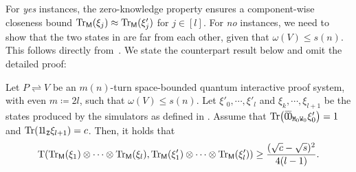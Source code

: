 \documentclass[10pt,a4paper]{article}
\numberwithin{equation}{section}
\numberwithin{figure}{section}
\newcommand{\protocol}[2]{{#1}\!\rightleftharpoons\!{#2}}
\DeclarePairedDelimiter\rbra{\lparen}{\rparen}
\let\ket\relax\DeclarePairedDelimiter\ket{\lvert}{\rangle}
\let\bra\relax\DeclarePairedDelimiter\bra{\langle}{\rvert}
\newcommand{\ketbra}[2]{\ensuremath{\ket{#1}\!\bra{#2}}}
\newcommand{\Tr}{\mathrm{Tr}}
\newcommand{\td}{\mathrm{T}}
\newcommand{\sfM}{\mathsf{M}}
\newcommand{\ttM}{\mathtt{M}}
\newcommand{\ttW}{\mathtt{W}}
\newcommand{\ttZ}{\mathtt{Z}}
\begin{document}
For \textit{yes} instances, the zero-knowledge property ensures a component-wise closeness bound $\Tr_{\sfM}\rbra*{\xi_j} \approx \Tr_{\sfM}(\xi'_j)$ for $j\in[l]$. 
For \textit{no} instances, we need to show that the two states in  are far from each other, given that $\omega(V) \leq s(n)$. This follows directly from~\cite[Lemma 15]{Wat02QSZK}. We state the counterpart result below and omit the detailed proof: 
\begin{proposition}
    \label{prop:QSZKLhard-soundness}
    Let $\protocol{P}{V}$ be an $m(n)$-turn space-bounded quantum interactive proof system, with even $m\coloneq 2l$, such that $\omega(V) \leq s(n)$. Let $\xi'_0,\cdots,\xi'_l$ and $\xi_k,\cdots,\xi_{l+1}$ be the states produced by the simulators as defined in . Assume that $\Tr\rbra*{\ketbra{\bar{0}}{\bar{0}}_{\ttM_0\ttW_0} \xi'_0} = 1$ and $\Tr\rbra*{\ketbra{1}{1}_{\ttZ} \xi_{l+1}} = c$. Then, it holds that
    \[ \td\rbra*{\Tr_{\sfM}(\xi_1)\otimes \cdots \otimes \Tr_{\sfM}(\xi_l), \Tr_{\sfM}\rbra*{\xi'_1}\otimes \cdots \otimes \Tr_{\sfM}\rbra*{\xi'_l}} \geq \frac{(\sqrt{c}-\sqrt{s})^2}{4(l-1)}.\]
\end{proposition}
\end{document}
